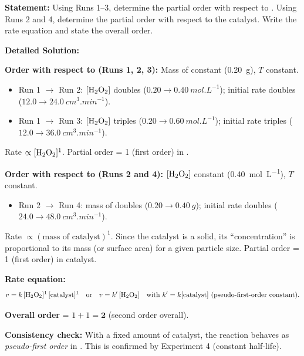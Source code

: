 \documentclass[11pt]{article}
\newcommand{\cle}[1]{{\popxbold\color{popdark}#1}}
\begin{document}
\begin{exoresolu}
\textbf{Statement:} Using Runs 1--3, determine the partial order with respect to . Using Runs 2 and 4, determine the partial order with respect to the  catalyst. Write the rate equation and state the overall order.

\tcblower
\textbf{Detailed Solution:}

\textbf{Order with respect to  (Runs 1, 2, 3):} Mass of  constant (\SI{0.20}{g}), $T$ constant.
\begin{itemize}
    \item Run 1 $\to$ Run 2: $[\ce{H2O2}]$ doubles ($0.20 \to \SI{0.40}{mol.L^{-1}}$); initial rate doubles ($12.0 \to \SI{24.0}{cm^3.min^{-1}}$).
    \item Run 1 $\to$ Run 3: $[\ce{H2O2}]$ triples ($0.20 \to \SI{0.60}{mol.L^{-1}}$); initial rate triples ($12.0 \to \SI{36.0}{cm^3.min^{-1}}$).
\end{itemize}
Rate $\propto [\ce{H2O2}]^1$. \cle{Partial order = 1 (first order)} in .

\textbf{Order with respect to  (Runs 2 and 4):} $[\ce{H2O2}]$ constant (\SI{0.40}{mol.L^{-1}}), $T$ constant.
\begin{itemize}
    \item Run 2 $\to$ Run 4: mass of  doubles ($0.20 \to \SI{0.40}{g}$); initial rate doubles ($24.0 \to \SI{48.0}{cm^3.min^{-1}}$).
\end{itemize}
Rate $\propto (\text{mass of catalyst})^1$. Since the catalyst is a solid, its ``concentration'' is proportional to its mass (or surface area) for a given particle size. \cle{Partial order = 1 (first order)} in catalyst.

\textbf{Rate equation:}
\[
v = k\,[\ce{H2O2}]^1\,[\text{catalyst}]^1 \quad \text{or} \quad v = k'\,[\ce{H2O2}] \quad \text{with } k' = k[\text{catalyst}] \text{ (pseudo-first-order constant)}.
\]

\textbf{Overall order} = $1 + 1 = \mathbf{2}$ (second order overall).

\textbf{Consistency check:} With a fixed amount of catalyst, the reaction behaves as \emph{pseudo-first order} in . This is confirmed by Experiment 4 (constant half-life).
\end{exoresolu}
\end{document}
